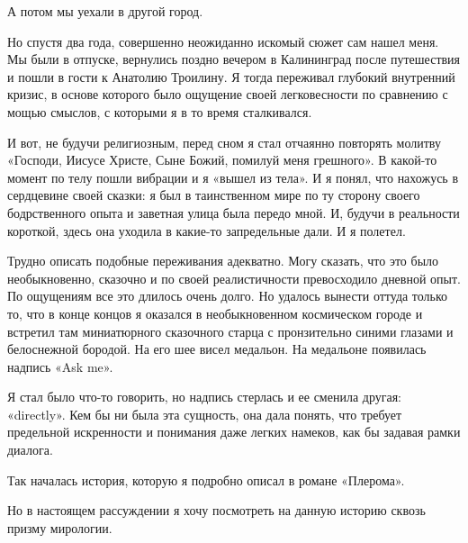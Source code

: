 А потом мы уехали в другой город.

Но спустя два года, совершенно неожиданно искомый сюжет сам нашел меня. Мы были в отпуске, вернулись поздно вечером в Калининград после путешествия и пошли в гости к Анатолию Троилину. Я тогда переживал глубокий внутренний кризис, в основе которого было ощущение своей легковесности по сравнению с мощью смыслов, с которыми я в то время сталкивался.

И вот, не будучи религиозным, перед сном я стал отчаянно повторять молитву «Господи, Иисусе Христе, Сыне Божий, помилуй меня грешного». В какой-то момент по телу пошли вибрации и я «вышел из тела». И я понял, что нахожусь в сердцевине своей сказки: я был в таинственном мире по ту сторону своего бодрственного опыта и заветная улица была передо мной. И, будучи в реальности короткой, здесь она уходила в какие-то запредельные дали. И я полетел.

Трудно описать подобные переживания адекватно. Могу сказать, что это было необыкновенно, сказочно и по своей реалистичности превосходило дневной опыт. По ощущениям все это длилось очень долго. Но удалось вынести оттуда только то, что в конце концов я оказался в необыкновенном космическом городе и встретил там миниатюрного сказочного старца с пронзительно синими глазами и белоснежной бородой. На его шее висел медальон. На медальоне появилась надпись «Ask me».

Я стал было что-то говорить, но надпись стерлась и ее сменила другая: «directly». Кем бы ни была эта сущность, она дала понять, что требует предельной искренности и понимания даже легких намеков, как бы задавая рамки диалога.

Так началась история, которую я подробно описал в романе «Плерома».

Но в настоящем рассуждении я хочу посмотреть на данную историю сквозь призму мирологии.

